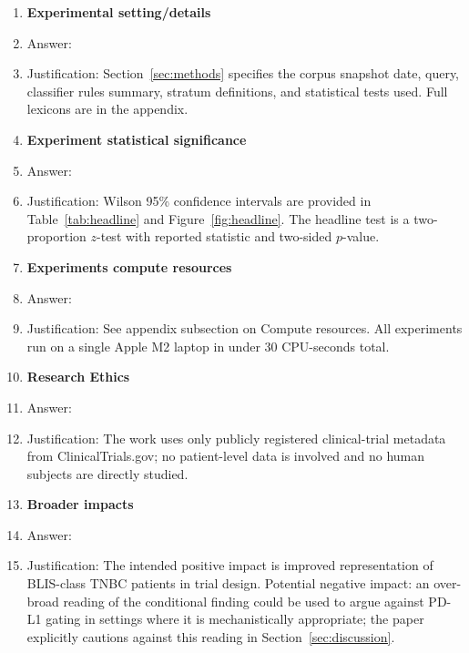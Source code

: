 \documentclass{article}
\begin{document}
\begin{enumerate}
\item {\bf Experimental setting/details}
    \item[] Answer: \answerYes{}
    \item[] Justification: Section~\ref{sec:methods} specifies the
    corpus snapshot date, query, classifier rules summary, stratum
    definitions, and statistical tests used.  Full lexicons are in
    the appendix.

\item {\bf Experiment statistical significance}
    \item[] Answer: \answerYes{}
    \item[] Justification: Wilson 95\% confidence intervals are
    provided in Table~\ref{tab:headline} and Figure~\ref{fig:headline}.
    The headline test is a two-proportion $z$-test with reported
    statistic and two-sided $p$-value.

\item {\bf Experiments compute resources}
    \item[] Answer: \answerYes{}
    \item[] Justification: See appendix subsection on Compute
    resources.  All experiments run on a single Apple M2 laptop in
    under 30 CPU-seconds total.

\item {\bf Research Ethics}
    \item[] Answer: \answerYes{}
    \item[] Justification: The work uses only publicly registered
    clinical-trial metadata from ClinicalTrials.gov; no patient-level
    data is involved and no human subjects are directly studied.

\item {\bf Broader impacts}
    \item[] Answer: \answerYes{}
    \item[] Justification: The intended positive impact is improved
    representation of BLIS-class TNBC patients in trial design.
    Potential negative impact: an over-broad reading of the
    conditional finding could be used to argue against PD-L1 gating
    in settings where it is mechanistically appropriate; the paper
    explicitly cautions against this reading in
    Section~\ref{sec:discussion}.

\end{enumerate}
\end{document}
